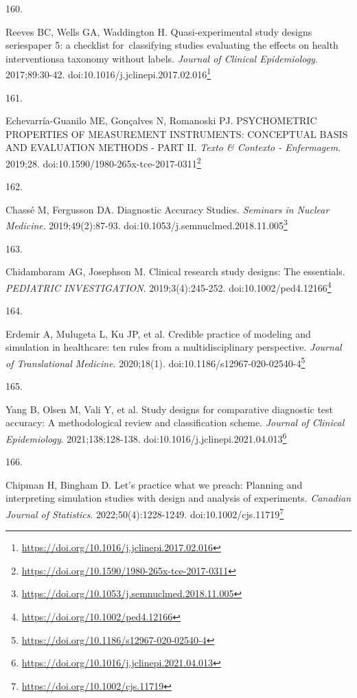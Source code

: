 \documentclass[
  a4paper,
]{book}
\newlength{\cslhangindent}
\newlength{\csllabelwidth}
\newlength{\cslentryspacingunit} %
\newenvironment{CSLReferences}[2] %
 {%
  \setlength{\parindent}{0pt}
  \ifodd #1
  \let\oldpar\par
  \def\par{\hangindent=\cslhangindent\oldpar}
  \fi
  \setlength{\parskip}{#2\cslentryspacingunit}
 }%
 {}
\newcommand{\CSLLeftMargin}[1]{\parbox[t]{\csllabelwidth}{#1}}
\newcommand{\CSLRightInline}[1]{\parbox[t]{\linewidth - \csllabelwidth}{#1}\break}
\renewcommand{\href}[2]{#2\footnote{\url{#1}}}
\begin{document}
\begin{CSLReferences}{0}{0}
\leavevmode{}%
\CSLLeftMargin{160. }%
\CSLRightInline{Reeves BC, Wells GA, Waddington H. Quasi-experimental study designs series{\textemdash}paper 5: a checklist for~classifying studies evaluating the effects on health interventions{\textemdash}a taxonomy without labels. \emph{Journal of Clinical Epidemiology}. 2017;89:30-42. doi:\href{https://doi.org/10.1016/j.jclinepi.2017.02.016}{10.1016/j.jclinepi.2017.02.016}}

\leavevmode{}%
\CSLLeftMargin{161. }%
\CSLRightInline{Echevarría-Guanilo ME, Gonçalves N, Romanoski PJ. PSYCHOMETRIC PROPERTIES OF MEASUREMENT INSTRUMENTS: CONCEPTUAL BASIS AND EVALUATION METHODS - PART II. \emph{Texto \& Contexto - Enfermagem}. 2019;28. doi:\href{https://doi.org/10.1590/1980-265x-tce-2017-0311}{10.1590/1980-265x-tce-2017-0311}}

\leavevmode{}%
\CSLLeftMargin{162. }%
\CSLRightInline{Chassé M, Fergusson DA. Diagnostic Accuracy Studies. \emph{Seminars in Nuclear Medicine}. 2019;49(2):87-93. doi:\href{https://doi.org/10.1053/j.semnuclmed.2018.11.005}{10.1053/j.semnuclmed.2018.11.005}}

\leavevmode{}%
\CSLLeftMargin{163. }%
\CSLRightInline{Chidambaram AG, Josephson M. Clinical research study designs: The essentials. \emph{PEDIATRIC INVESTIGATION}. 2019;3(4):245-252. doi:\href{https://doi.org/10.1002/ped4.12166}{10.1002/ped4.12166}}

\leavevmode{}%
\CSLLeftMargin{164. }%
\CSLRightInline{Erdemir A, Mulugeta L, Ku JP, et al. Credible practice of modeling and simulation in healthcare: ten rules from a multidisciplinary perspective. \emph{Journal of Translational Medicine}. 2020;18(1). doi:\href{https://doi.org/10.1186/s12967-020-02540-4}{10.1186/s12967-020-02540-4}}

\leavevmode{}%
\CSLLeftMargin{165. }%
\CSLRightInline{Yang B, Olsen M, Vali Y, et al. Study designs for comparative diagnostic test accuracy: A methodological review and classification scheme. \emph{Journal of Clinical Epidemiology}. 2021;138:128-138. doi:\href{https://doi.org/10.1016/j.jclinepi.2021.04.013}{10.1016/j.jclinepi.2021.04.013}}

\leavevmode{}%
\CSLLeftMargin{166. }%
\CSLRightInline{Chipman H, Bingham D. Let's practice what we preach: Planning and interpreting simulation studies with design and analysis of experiments. \emph{Canadian Journal of Statistics}. 2022;50(4):1228-1249. doi:\href{https://doi.org/10.1002/cjs.11719}{10.1002/cjs.11719}}


\end{CSLReferences}
\end{document}

